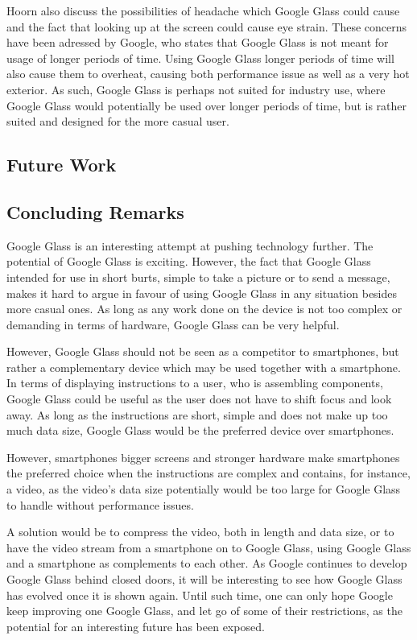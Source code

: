 Hoorn also discuss the possibilities of headache which Google Glass could cause and the fact that looking up at the screen could cause eye strain. These concerns have been adressed by Google, who states that Google Glass is not meant for usage of longer periods of time. Using Google Glass longer periods of time will also cause them to overheat, causing both performance issue as well as a very hot exterior. As such, Google Glass is perhaps not suited for industry use, where Google Glass would potentially be used over longer periods of time, but is rather suited and designed for the more casual user.

\subsection{Future Work}
\label{subsec:futurework}


\subsection{Concluding Remarks}
Google Glass is an interesting attempt at pushing technology further. The potential of Google Glass is exciting. However, the fact that Google Glass intended for use in short burts, simple to take a picture or to send a message, makes it hard to argue in favour of using Google Glass in any situation besides more casual ones. As long as any work done on the device is not too complex or demanding in terms of hardware, Google Glass can be very helpful.

However, Google Glass should not be seen as a competitor to smartphones, but rather a complementary device which may be used together with a smartphone. In terms of displaying instructions to a user, who is assembling components, Google Glass could be useful as the user does not have to shift focus and look away. As long as the instructions are short, simple and does not make up too much data size, Google Glass would be the preferred device over smartphones.

However, smartphones bigger screens and stronger hardware make smartphones the preferred choice when the instructions are complex and contains, for instance, a video, as the video's data size potentially would be too large for Google Glass to handle without performance issues.

A solution would be to compress the video, both in length and data size, or to have the video stream from a smartphone on to Google Glass, using Google Glass and a smartphone as complements to each other. As Google continues to develop Google Glass behind closed doors, it will be interesting to see how Google Glass has evolved once it is shown again. Until such time, one can only hope Google keep improving one Google Glass, and let go of some of their restrictions, as the potential for an interesting future has been exposed. 